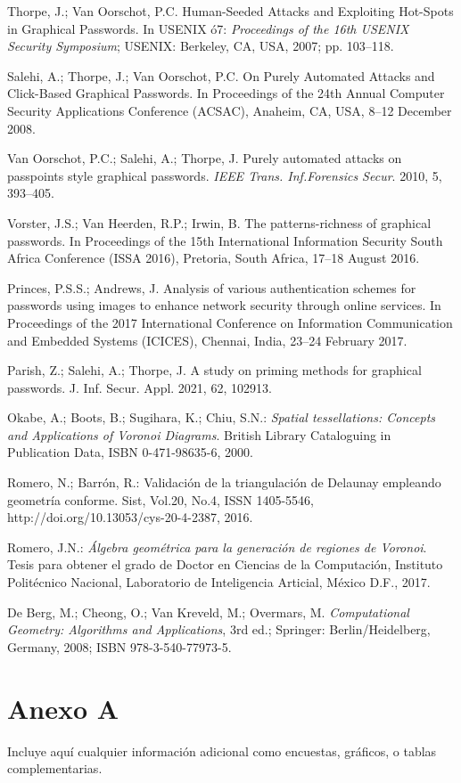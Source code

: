 \documentclass[12pt]{report}
\begin{document}
\begin{thebibliography}{9}
{		Thorpe, J.; Van Oorschot, P.C. Human-Seeded Attacks and Exploiting Hot-Spots in Graphical Passwords. In USENIX ó7: \textit{Proceedings of the 16th USENIX Security Symposium}; USENIX: Berkeley, CA, USA, 2007; pp. 103–118.
		
		Salehi, A.; Thorpe, J.; Van Oorschot, P.C. On Purely Automated Attacks and Click-Based Graphical Passwords. In Proceedings of the 24th Annual Computer Security Applications Conference (ACSAC), Anaheim, CA, USA, 8–12 December 2008.
		
		Van Oorschot, P.C.; Salehi, A.; Thorpe, J. Purely automated attacks on passpoints style graphical passwords.\textit{ IEEE Trans. Inf.Forensics Secur}. 2010, 5, 393–405.
		
		Vorster, J.S.; Van Heerden, R.P.; Irwin, B. The patterns-richness of graphical passwords. In Proceedings of the 15th International Information Security South Africa Conference (ISSA 2016), Pretoria, South Africa, 17–18 August 2016.
		
		Princes, P.S.S.; Andrews, J. Analysis of various authentication schemes for passwords using images to enhance network security through online services. In Proceedings of the 2017 International Conference on Information Communication and Embedded Systems (ICICES), Chennai, India, 23–24 February 2017.
		
		Parish, Z.; Salehi, A.; Thorpe, J. A study on priming methods for graphical passwords. J. Inf. Secur. Appl. 2021, 62, 102913.
		
		Okabe, A.; Boots, B.; Sugihara, K.; Chiu, S.N.: \textit{Spatial tessellations: Concepts and Applications of Voronoi Diagrams}. British Library Cataloguing in Publication Data, ISBN 0-471-98635-6, 2000.
		
		Romero, N.; Barrón, R.: Validación de la triangulación de Delaunay empleando geometría conforme. Sist, Vol.20, No.4, ISSN 1405-5546, http://doi.org/10.13053/cys-20-4-2387, 2016.
		
		Romero, J.N.:  \textit{Álgebra geométrica para la generación de regiones de Voronoi}. Tesis para obtener el grado de Doctor en Ciencias de la Computación, Instituto Politécnico Nacional, Laboratorio de Inteligencia Articial, México D.F., 2017.
		
		De Berg, M.; Cheong, O.; Van Kreveld, M.; Overmars, M. \textit{Computational Geometry: Algorithms and Applications}, 3rd ed.; Springer: Berlin/Heidelberg, Germany, 2008; ISBN 978-3-540-77973-5.
	
}
\end{thebibliography}


\appendix
\chapter{Anexo A}
Incluye aquí cualquier información adicional como encuestas, gráficos, o tablas complementarias.
\end{document}
